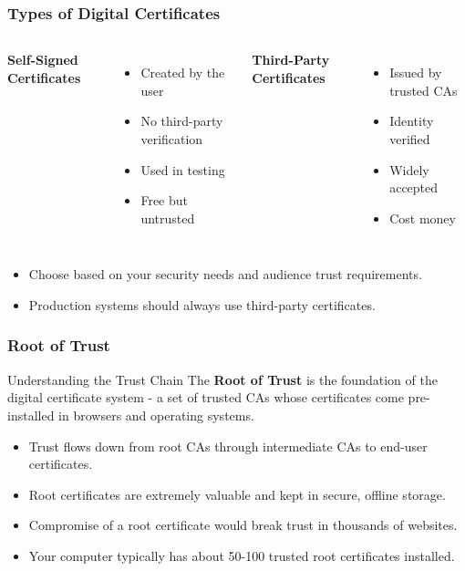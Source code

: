 \documentclass{beamer}
\begin{document}
\begin{frame}
    \frametitle{Types of Digital Certificates}
    
    \begin{columns}[t]
            \textbf{Self-Signed Certificates}
            \begin{itemize}
                \item Created by the user
                \item No third-party verification
                \item Used in testing
                \item Free but untrusted
            \end{itemize}
        
            \textbf{Third-Party Certificates}
            \begin{itemize}
                \item Issued by trusted CAs
                \item Identity verified
                \item Widely accepted
                \item Cost money
            \end{itemize}
    \end{columns}
    
    \begin{itemize}
        \item Choose based on your security needs and audience trust requirements.
        \item Production systems should always use third-party certificates.
    \end{itemize}
\end{frame}

\begin{frame}
    \frametitle{Root of Trust}
    
    \begin{block}{Understanding the Trust Chain}
        The \textbf{Root of Trust} is the foundation of the digital certificate system - a set of trusted CAs whose certificates come pre-installed in browsers and operating systems.
    \end{block}
    
    \begin{itemize}
        \item Trust flows down from root CAs through intermediate CAs to end-user certificates.
        
        \item Root certificates are extremely valuable and kept in secure, offline storage.
        
        \item Compromise of a root certificate would break trust in thousands of websites.
        
        \item Your computer typically has about 50-100 trusted root certificates installed.
    \end{itemize}
\end{frame}
\end{document}
